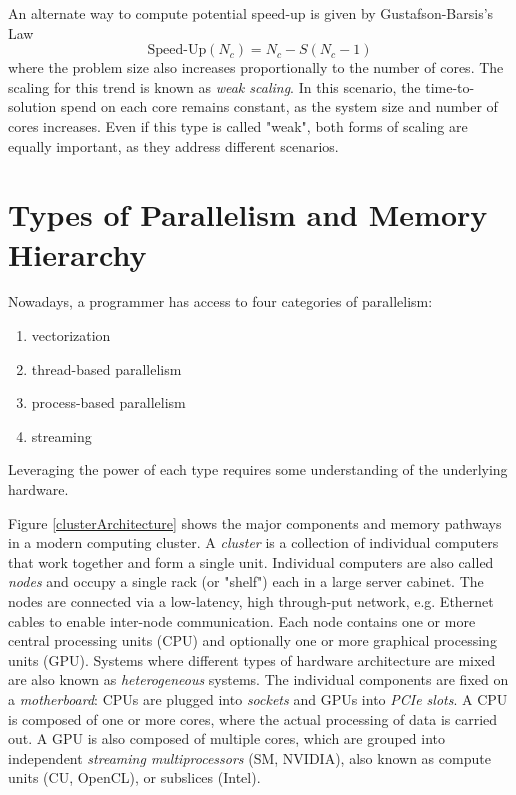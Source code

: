 An alternate way to compute potential speed-up is given by Gustafson-Barsis's Law
\begin{equation}
\textrm{Speed-Up}(N_c) = N_c - S(N_c-1)
\end{equation}
\noindent where the problem size also increases proportionally to the number of cores. The scaling for this trend is known as \emph{weak scaling}. In this scenario, the time-to-solution spend on each core remains constant, as the system size and number of cores increases. Even if this type is called "weak", both forms of scaling are equally important, as they address different scenarios. 

\section{Types of Parallelism and Memory Hierarchy}

Nowadays, a programmer has access to four categories of parallelism:
\begin{enumerate}
\item vectorization
\item thread-based parallelism
\item process-based parallelism
\item streaming
\end{enumerate} 
\noindent Leveraging the power of each type requires some understanding of the underlying hardware. 

Figure \ref{clusterArchitecture} shows the major components and memory pathways in a modern computing cluster. A \emph{cluster} is a collection of individual computers that work together and form a single unit. Individual computers are also called \emph{nodes} and occupy a single rack (or "shelf") each in a large server cabinet. The nodes are connected via a low-latency, high through-put network, e.g. Ethernet cables to enable inter-node communication. Each node contains one or more central processing units (CPU) and optionally one or more graphical processing units (GPU). Systems where different types of hardware architecture are mixed are also known as \emph{heterogeneous} systems. The individual components are fixed on a \emph{motherboard}: CPUs are plugged into \emph{sockets} and GPUs into \emph{PCIe slots}. A CPU is composed of one or more cores, where the actual processing of data is carried out. A GPU is also composed of multiple cores, which are grouped into independent \emph{streaming multiprocessors} (SM, NVIDIA), also known as compute units (CU, OpenCL), or subslices (Intel). 

